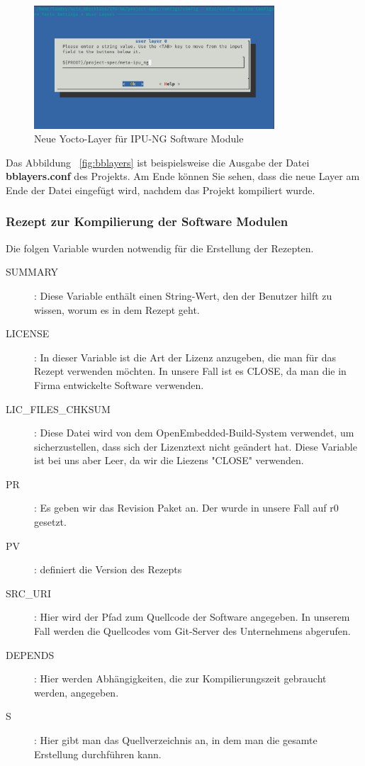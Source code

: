 	\begin{figure}[H]
		\begin{center}		\includegraphics[width=0.8\textwidth]{./images/ip_ng_layer.jpg}
		\end{center}
		\vspace{-5pt}
		\caption[Neue Yocto-Ebene für IPU-NG Software Module]{Neue Yocto-Layer für IPU-NG Software Module} %
		\label{fig:yocto_layer_ipu_ng}
		\vspace{-5pt}
	\end{figure}

Das Abbildung ~\ref{fig:bblayers} ist beispielsweise die Ausgabe der Datei \textbf{bblayers.conf} des Projekts. Am Ende können Sie sehen, dass die neue Layer am Ende der Datei eingefügt wird, nachdem das Projekt kompiliert wurde. 
	\subsubsection{Rezept zur Kompilierung der Software Modulen}
	Die folgen Variable wurden notwendig für die Erstellung der Rezepten. 
	\begin{description}
		\item[SUMMARY]: Diese Variable enthält einen String-Wert, den der Benutzer hilft zu wissen, worum es in dem Rezept geht.
		\item[LICENSE]: In dieser Variable ist die Art der Lizenz anzugeben, die man für das Rezept verwenden möchten. In unsere Fall ist es CLOSE, da man die in Firma entwickelte Software verwenden.
		\item[LIC_FILES_CHKSUM]: Diese Datei wird von dem OpenEmbedded-Build-System verwendet, um sicherzustellen, dass sich der Lizenztext nicht geändert hat. Diese Variable ist bei uns aber Leer, da wir die Liezens "CLOSE" verwenden.
		\item[PR]: Es geben wir das Revision Paket an. Der wurde in unsere Fall auf r0 gesetzt. 
		\item[PV]: definiert die Version des Rezepts
		\item[SRC_URI]: Hier wird der Pfad zum Quellcode der Software angegeben. In unserem Fall werden die Quellcodes vom Git-Server des Unternehmens abgerufen.
		\item[DEPENDS]: Hier werden Abhängigkeiten, die zur Kompilierungszeit gebraucht werden, angegeben.
		\item[S]: Hier gibt man das Quellverzeichnis an, in dem man die gesamte Erstellung durchführen kann.
	\end{description}
		
